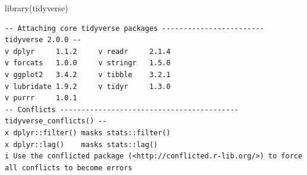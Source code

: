 \documentclass[
  letterpaper,
  DIV=11,
  numbers=noendperiod]{scrreport}
\newenvironment{Shaded}{\begin{snugshade}}{\end{snugshade}}
\newcommand{\FunctionTok}[1]{\textcolor[rgb]{0.28,0.35,0.67}{#1}}
\newcommand{\NormalTok}[1]{\textcolor[rgb]{0.00,0.23,0.31}{#1}}
\begin{document}
\begin{Shaded}
\begin{Highlighting}[]
\FunctionTok{library}\NormalTok{(tidyverse)}
\end{Highlighting}
\end{Shaded}

\begin{verbatim}
-- Attaching core tidyverse packages ------------------------ tidyverse 2.0.0 --
v dplyr     1.1.2     v readr     2.1.4
v forcats   1.0.0     v stringr   1.5.0
v ggplot2   3.4.2     v tibble    3.2.1
v lubridate 1.9.2     v tidyr     1.3.0
v purrr     1.0.1     
-- Conflicts ------------------------------------------ tidyverse_conflicts() --
x dplyr::filter() masks stats::filter()
x dplyr::lag()    masks stats::lag()
i Use the conflicted package (<http://conflicted.r-lib.org/>) to force all conflicts to become errors
\end{verbatim}
\end{document}
